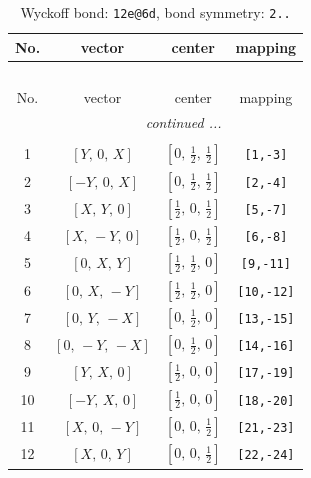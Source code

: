 \documentclass[fleqn,8pt]{jsarticle}
\begin{document}
\renewcommand{\arraystretch}{1.2}
\begin{longtable}{cccc}
\caption{Wyckoff bond: {\tt 12e@6d}, bond symmetry: {\tt 2..}}
 \\
 \hline \hline
No. & vector & center & mapping \\ \hline \endfirsthead

\multicolumn{3}{l}{\tablename\ \thetable{}} \\
 \hline \hline
No. & vector & center & mapping \\ \hline \endhead

 \hline \hline
\multicolumn{3}{r}{\footnotesize\it continued ...} \\ \endfoot

 \hline \hline
\multicolumn{3}{r}{} \\ \endlastfoot

1 & $\left[ Y,\, 0,\, X \right]$ & $\left[ 0,\, \frac{1}{2},\, \frac{1}{2} \right]$ & {\tt [1,-3]} \\ \hline
2 & $\left[ - Y,\, 0,\, X \right]$ & $\left[ 0,\, \frac{1}{2},\, \frac{1}{2} \right]$ & {\tt [2,-4]} \\ \hline
3 & $\left[ X,\, Y,\, 0 \right]$ & $\left[ \frac{1}{2},\, 0,\, \frac{1}{2} \right]$ & {\tt [5,-7]} \\ \hline
4 & $\left[ X,\, - Y,\, 0 \right]$ & $\left[ \frac{1}{2},\, 0,\, \frac{1}{2} \right]$ & {\tt [6,-8]} \\ \hline
5 & $\left[ 0,\, X,\, Y \right]$ & $\left[ \frac{1}{2},\, \frac{1}{2},\, 0 \right]$ & {\tt [9,-11]} \\ \hline
6 & $\left[ 0,\, X,\, - Y \right]$ & $\left[ \frac{1}{2},\, \frac{1}{2},\, 0 \right]$ & {\tt [10,-12]} \\ \hline
7 & $\left[ 0,\, Y,\, - X \right]$ & $\left[ 0,\, \frac{1}{2},\, 0 \right]$ & {\tt [13,-15]} \\ \hline
8 & $\left[ 0,\, - Y,\, - X \right]$ & $\left[ 0,\, \frac{1}{2},\, 0 \right]$ & {\tt [14,-16]} \\ \hline
9 & $\left[ Y,\, X,\, 0 \right]$ & $\left[ \frac{1}{2},\, 0,\, 0 \right]$ & {\tt [17,-19]} \\ \hline
10 & $\left[ - Y,\, X,\, 0 \right]$ & $\left[ \frac{1}{2},\, 0,\, 0 \right]$ & {\tt [18,-20]} \\ \hline
11 & $\left[ X,\, 0,\, - Y \right]$ & $\left[ 0,\, 0,\, \frac{1}{2} \right]$ & {\tt [21,-23]} \\ \hline
12 & $\left[ X,\, 0,\, Y \right]$ & $\left[ 0,\, 0,\, \frac{1}{2} \right]$ & {\tt [22,-24]} \\
\end{longtable}
\end{document}

